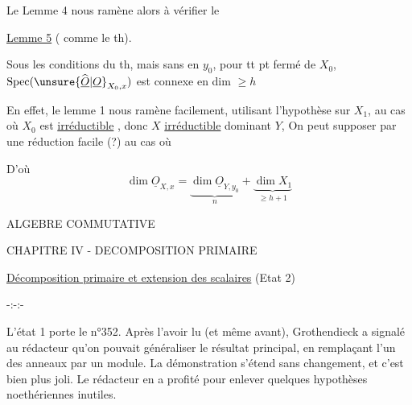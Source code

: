 Le Lemme 4 nous ramène
alors à vérifier le

\uline{Lemme 5} ( comme le th).

Sous les conditions du th, mais
sans 
en $y_0$,  pour tt pt fermé  de $X_0$,
 $\operatorname{Spec}(\unsure{\widehat{\underline O}|\underline O}_{X_0,x})$ est
connexe en dim $\geq h$


En effet, le lemme 1  nous
ramène facilement, utilisant
l'hypothèse sur $X_1$, au cas où
$X_0$ est \uline{irréductible} ,
donc $X$ \uline{irréductible} dominant $Y$,
On peut supposer par une réduction
facile (?) au cas où

D'où
\[
\dim\underline{O}_{X,x}
=\underbrace{\dim\underline{O}_{Y,y_0}}_{n}
+\underbrace{\dim X_1}_{\geq h+1}
\]


\begin{center}
ALGEBRE COMMUTATIVE

CHAPITRE IV - DECOMPOSITION PRIMAIRE

\uline{Décomposition primaire et extension des scalaires} (Etat 2)

-:-:-
\end{center}

L'état 1 porte le n°352. Après l'avoir lu (et même avant), Grothendieck
a signalé au rédacteur qu'on pouvait généraliser le résultat principal, en
remplaçant l'un des anneaux par un module. La démonstration s'étend sans
changement, et c'est bien plus joli. Le rédacteur en a profité pour enlever
quelques hypothèses noethériennes inutiles.

